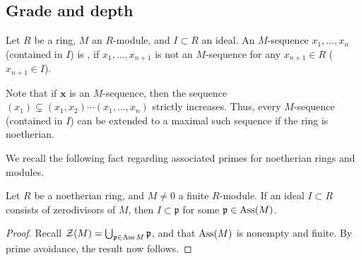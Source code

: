 \documentclass[12pt]{article}
\begin{document}
\subsection{Grade and depth}

\begin{defn}
	Let $R$ be a ring, $M$ an $R$-module, and $I \subset R$ an ideal. An $M$-sequence $x_{1}, \ldots, x_{n}$ (contained in $I$) is , if $x_{1}, \ldots, x_{n + 1}$ is not an $M$-sequence for any $x_{n + 1} \in R$ ($x_{n + 1} \in I$).	
\end{defn}

Note that if $\mathbf{x}$ is an $M$-sequence, then the sequence $(x_{1}) \subsetneq (x_{1}, x_{2}) \cdots (x_{1}, \ldots, x_{n})$ strictly increases. Thus, every $M$-sequence (contained in $I$) can be extended to a maximal such sequence if the ring is noetherian.

We recall the following fact regarding associated primes for noetherian rings and modules.

\begin{prop}
	Let $R$ be a noetherian ring, and $M \neq 0$ a finite $R$-module. If an ideal $I \subset R$ consists of zerodivisors of $M$, then $I \subset \mathfrak{p}$ for some $\mathfrak{p} \in \operatorname{Ass}(M)$.
\end{prop}
\begin{proof} 
	Recall $\mathcal{Z}(M) = \bigcup_{\mathfrak{p} \in \operatorname{Ass} M} \mathfrak{p}$, and that $\operatorname{Ass}(M)$ is nonempty and finite. By prime avoidance, the result now follows.
\end{proof}
\end{document}
